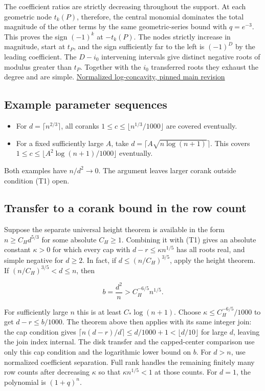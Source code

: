 The coefficient ratios are strictly decreasing throughout the support. At each geometric node $t_k(P)$, therefore, the central monomial dominates the total magnitude of the other terms by the same geometric-series bound with $q=e^{-3}$. This proves the sign $(-1)^k$ at $-t_k(P)$. The nodes strictly increase in magnitude, start at $t_P$, and the sign sufficiently far to the left is $(-1)^D$ by the leading coefficient. The $D-i_0$ intervening intervals give distinct negative roots of modulus greater than $t_P$. Together with the $i_0$ transferred roots they exhaust the degree and are simple. \href{https://github.com/ProgramComputer/open-math-research/blob/4fb624ba937a8eecc1361a6066185cd81ab7b172/topics/balanced-arrays/orientation-normalization.md}{Normalized log-concavity, pinned main revision}

\subsection{Example parameter sequences}

\begin{itemize}
\item For $d=\lceil n^{2/3}\rceil$, all coranks $1\le c\le\lfloor n^{1/3}/1000\rfloor$ are covered eventually.
\item For a fixed sufficiently large $A$, take $d=\lceil A\sqrt{n\log(n+1)}\rceil$. This covers $1\le c\le\lfloor A^2\log(n+1)/1000\rfloor$ eventually.
\end{itemize}

Both examples have $n/d^2\to0$. The argument leaves larger corank outside condition (T1) open.

\subsection{Transfer to a corank bound in the row count}

Suppose the separate universal height theorem is available in the form $n\ge C_Hd^{5/3}$ for some absolute $C_H\ge1$. Combining it with (T1) gives an absolute constant $\kappa>0$ for which every cap with $d-r\le\kappa n^{1/5}$ has all roots real, and simple negative for $d\ge2$. In fact, if $d\le(n/C_H)^{3/5}$, apply the height theorem. If $(n/C_H)^{3/5}<d\le n$, then

\begin{equation*}
b=\frac{d^2}{n}>C_H^{-6/5}n^{1/5}.
\end{equation*}

For sufficiently large $n$ this is at least $C_*\log(n+1)$. Choose $\kappa\le C_H^{-6/5}/1000$ to get $d-r\le b/1000$. The theorem above then applies with its same integer join: the cap condition gives $\lceil n(d-r)/d\rceil\le d/1000+1<\lfloor d/10\rfloor$ for large $d$, leaving the join index internal. The disk transfer and the capped-center comparison use only this cap condition and the logarithmic lower bound on $b$. For $d>n$, use normalized coefficient separation. Full rank handles the remaining finitely many row counts after decreasing $\kappa$ so that $\kappa n^{1/5}<1$ at those counts. For $d=1$, the polynomial is $(1+q)^n$.

